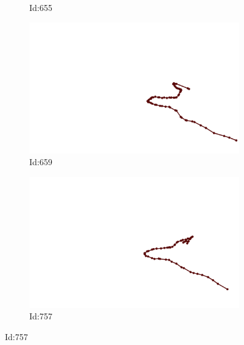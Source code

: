 \documentclass[12pt,twoside]{report}
\begin{document}
\begin{figure}
\begin{subfigure}[b]{0.20\textwidth}
\caption{Id:655}
\end{subfigure}
\begin{subfigure}[b]{0.20\textwidth}
\centering
\includegraphics[width=\textwidth]{../../trajectories/659.png}
\caption{Id:659}
\end{subfigure}
\begin{subfigure}[b]{0.20\textwidth}
\centering
\includegraphics[width=\textwidth]{../../trajectories/757.png}
\caption{Id:757}
\end{subfigure}
\end{figure}
\end{document}
